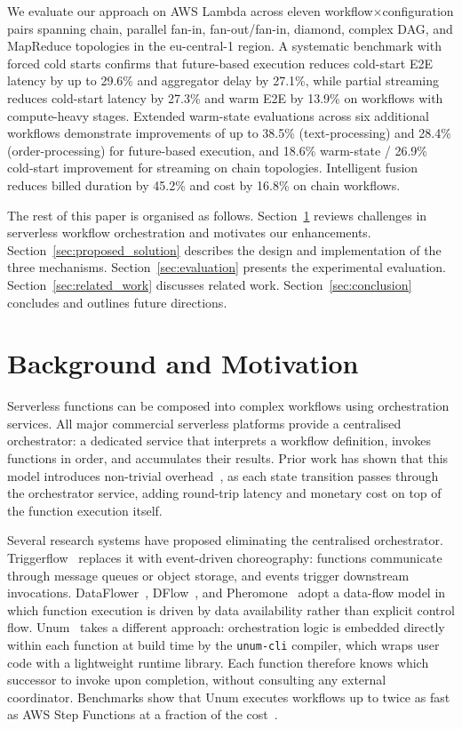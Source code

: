 \documentclass[runningheads]{llncs}
\begin{document}
We evaluate our approach on AWS Lambda across eleven workflow$\times$configuration pairs spanning chain, parallel fan-in, fan-out/fan-in, diamond, complex DAG, and MapReduce topologies in the eu-central-1 region. A systematic benchmark with forced cold starts confirms that future-based execution reduces cold-start E2E latency by up to 29.6\% and aggregator delay by 27.1\%, while partial streaming reduces cold-start latency by 27.3\% and warm E2E by 13.9\% on workflows with compute-heavy stages. Extended warm-state evaluations across six additional workflows demonstrate improvements of up to 38.5\% (text-processing) and 28.4\% (order-processing) for future-based execution, and 18.6\% warm-state / 26.9\% cold-start improvement for streaming on chain topologies. Intelligent fusion reduces billed duration by 45.2\% and cost by 16.8\% on chain workflows.

The rest of this paper is organised as follows. Section~\ref{sec:background} reviews challenges in serverless workflow orchestration and motivates our enhancements. Section~\ref{sec:proposed_solution} describes the design and implementation of the three mechanisms. Section~\ref{sec:evaluation} presents the experimental evaluation. Section~\ref{sec:related_work} discusses related work. Section~\ref{sec:conclusion} concludes and outlines future directions.

\section{Background and Motivation}
\label{sec:background}

Serverless functions can be composed into complex workflows using orchestration services. All major commercial serverless platforms provide a centralised orchestrator: a dedicated service that interprets a workflow definition, invokes functions in order, and accumulates their results. Prior work has shown that this model introduces non-trivial overhead~\cite{Arjona_2021,li2023dataflowerexploitingdataflowparadigm,285171,shi2023dflowefficientdataflowbasedinvocation,285113}, as each state transition passes through the orchestrator service, adding round-trip latency and monetary cost on top of the function execution itself.

Several research systems have proposed eliminating the centralised orchestrator. Triggerflow~\cite{Arjona_2021} replaces it with event-driven choreography: functions communicate through message queues or object storage, and events trigger downstream invocations. DataFlower~\cite{li2023dataflowerexploitingdataflowparadigm}, DFlow~\cite{shi2023dflowefficientdataflowbasedinvocation}, and Pheromone~\cite{285113} adopt a data-flow model in which function execution is driven by data availability rather than explicit control flow. Unum~\cite{285171} takes a different approach: orchestration logic is embedded directly within each function at build time by the \texttt{unum-cli} compiler, which wraps user code with a lightweight runtime library. Each function therefore knows which successor to invoke upon completion, without consulting any external coordinator. Benchmarks show that Unum executes workflows up to twice as fast as AWS Step Functions at a fraction of the cost~\cite{285171}.
\end{document}
